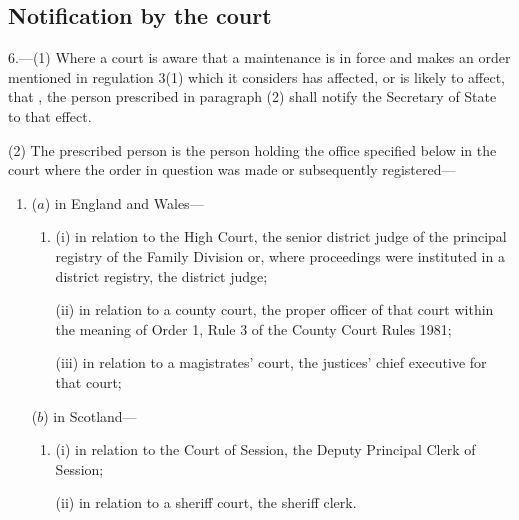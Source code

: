 \documentclass[12pt,a4paper]{article}
\begin{document}

\subsection[6. Notification by the court]{Notification by the court}

6.—(1) Where a court is aware that a maintenance  is in force and makes an order mentioned in regulation 3(1) which it considers has affected, or is likely to affect, that , the person prescribed in paragraph (2) shall notify the Secretary of State to that effect.

(2) The prescribed person is the person holding the office specified below in the court where the order in question was made or subsequently registered—
\begin{enumerate}\item[]
($a$) in England and Wales—
\begin{enumerate}\item[]
(i) in relation to the High Court, the senior district judge of the principal registry of the Family Division or, where proceedings were instituted in a district registry, the district judge;

(ii) in relation to a county court, the proper officer of that court within the meaning of Order 1, Rule 3 of the County Court Rules 1981;

(iii) in relation to a magistrates' court, the 
justices' chief executive for  %
that court;
\end{enumerate}

($b$) in Scotland—
\begin{enumerate}\item[]
(i) in relation to the Court of Session, the Deputy Principal Clerk of Session;

(ii) in relation to a sheriff court, the sheriff clerk.
\end{enumerate}
\end{enumerate}
\end{document}
